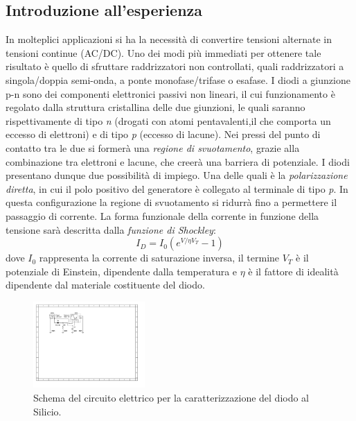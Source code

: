 \documentclass[journal]{IEEEtran}
\begin{document}
\subsection{\textbf{Introduzione all'esperienza}}
In molteplici applicazioni si ha la necessità di convertire tensioni alternate in tensioni continue (AC/DC). Uno dei modi più immediati per ottenere tale risultato è quello di sfruttare raddrizzatori non controllati, quali raddrizzatori a singola/doppia semi-onda, a ponte monofase/trifase o esafase.
I diodi a giunzione p-n sono dei componenti elettronici passivi non lineari, il cui funzionamento è regolato dalla struttura cristallina delle due giunzioni, le quali saranno rispettivamente di tipo \textit{n} (drogati con atomi pentavalenti,il che comporta un eccesso di elettroni) e di tipo \textit{p} (eccesso di lacune). Nei pressi del punto di contatto tra le due si formerà una \textit{regione di svuotamento}, grazie alla combinazione tra elettroni e lacune, che creerà una barriera di potenziale. I diodi presentano dunque due possibilità di impiego. Una delle quali è la \textit{polarizzazione diretta}, in cui il polo positivo del generatore è collegato al terminale di
tipo \textit{p}. In questa configurazione la regione di svuotamento si ridurrà fino a permettere il passaggio di corrente. La forma funzionale della corrente in funzione della tensione sarà descritta dalla \textit{funzione di Shockley}: \[I_{D} = I_{0}(e^{V/\eta V_T}-1)\] dove $I_{0}$ rappresenta la corrente di saturazione inversa, il termine $V_{T}$ è il potenziale di Einstein, dipendente dalla temperatura e $\eta$ è il fattore di idealità dipendente dal materiale costituente del diodo.
\begin{figure}[H]%
\begin{center}
\includegraphics[width=0.38\textwidth]{sch-simulations/output/Diode-rectifier.pdf}
\caption{Schema del circuito elettrico per la caratterizzazione del diodo al Silicio.}
\label{fig:diode-rectifier}
\end{center}
\end{figure}
\end{document}
